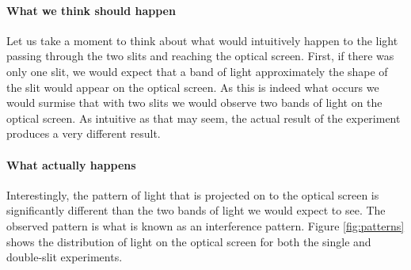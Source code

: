\documentclass[authoryearcitations]{UoYCSproject}
\begin{document}
\paragraph{What we think should happen}
Let us take a moment to think about what would intuitively happen to the light passing through the two slits and reaching the
optical screen. First, if there was only one slit, we would expect that a band of light approximately the shape of the slit would 
appear on the optical screen. As this is indeed what occurs we would surmise that with two slits we would observe two bands of
light on the optical screen. As intuitive as that may seem, the actual result of the experiment produces a very different result.

\paragraph{What actually happens}
Interestingly, the pattern of light that is projected on to the optical screen is significantly different than the two 
bands of light we 
would expect to see. The observed pattern is what is known as an interference pattern. Figure \ref{fig:patterns}
shows the distribution of light on the optical screen for both the single and double-slit experiments.  
\end{document}
